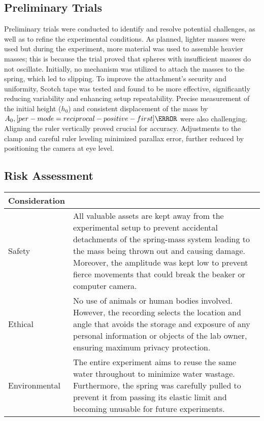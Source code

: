 \documentclass[a4paper,12pt]{article}
\let\oldsi\si
\renewcommand{\si}[1]{\oldsi[per-mode=reciprocal-positive-first]{#1}}
\newcommand{\thcolor}{\cellcolor{Blue!25}}
\begin{document}
\subsection{Preliminary Trials}

Preliminary trials were conducted to identify and resolve potential challenges, as well as to refine the experimental conditions. As planned, lighter masses were used but during the experiment, more material was used to assemble heavier masses; this is because the trial proved that spheres with insufficient masses do not oscillate. Initially, no mechanism was utilized to attach the masses to the spring, which led to slipping. To improve the attachment's security and uniformity, Scotch tape was tested and found to be more effective, significantly reducing variability and enhancing setup repeatability. Precise measurement of the initial height ($h_0$) and consistent displacement of the mass by $A_0,\si{\cm}$ were also challenging. Aligning the ruler vertically proved crucial for accuracy. Adjustments to the clamp and careful ruler leveling minimized parallax error, further reduced by positioning the camera at eye level.

\subsection{Risk Assessment}

\begin{center}
  \begin{tabular}{|P{0.19\textwidth}|p{0.71\textwidth}|}
    \hline
    \thcolor Consideration & \multicolumn{1}{c|}{\thcolor {Relevance and Mitigation}         }                                                                                                                                                                                                                                   \\ \hline
    Safety                 & All valuable assets are kept away from the experimental setup to prevent accidental detachments of the spring-mass system leading to the mass being thrown out and causing damage. Moreover, the amplitude was kept low to prevent fierce movements that could break the beaker or computer camera. \\ \hline
    Ethical                & No use of animals or human bodies involved. However, the recording selects the location and angle that avoids the storage and exposure of any personal information or objects of the lab owner, ensuring maximum privacy protection.                                                                \\ \hline
    Environmental          & The entire experiment aims to reuse the same water throughout to minimize water wastage.    Furthermore, the spring was carefully pulled to prevent it from passing its elastic limit and becoming unusable for future experiments.                                                                 \\ \hline
  \end{tabular}
  \label{tab:3}
\end{center}
\end{document}
